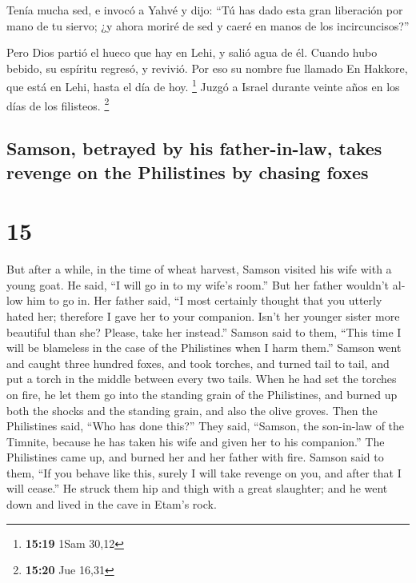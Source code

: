 \begin{paracol}{2}
 Tenía mucha sed, e invocó a Yahvé y dijo: ``Tú has dado
esta gran liberación por mano de tu siervo; ¿y ahora moriré de sed y
caeré en manos de los incircuncisos?''

 Pero Dios partió el hueco que hay en Lehi, y salió agua
de él. Cuando hubo bebido, su espíritu regresó, y revivió. Por eso su
nombre fue llamado En Hakkore, que está en Lehi, hasta el día de hoy.
\footnote{\textbf{15:19} 1Sam 30,12}  Juzgó a Israel
durante veinte años en los días de los filisteos. \footnote{\textbf{15:20}
  Jue 16,31}

\switchcolumn
\begin{otherlanguage}{english}

\hypertarget{samson-betrayed-by-his-father-in-law-takes-revenge-on-the-philistines-by-chasing-foxes}{%
\subsection{Samson, betrayed by his father-in-law, takes revenge on the
Philistines by chasing
foxes}\label{samson-betrayed-by-his-father-in-law-takes-revenge-on-the-philistines-by-chasing-foxes}}

\hypertarget{section-29}{%
\section{15}\label{section-29}}

 But after a while, in the time of wheat harvest, Samson
visited his wife with a young goat. He said, ``I will go in to my wife's
room.'' But her father wouldn't allow him to go in.  Her
father said, ``I most certainly thought that you utterly hated her;
therefore I gave her to your companion. Isn't her younger sister more
beautiful than she? Please, take her instead.''  Samson
said to them, ``This time I will be blameless in the case of the
Philistines when I harm them.''  Samson went and caught
three hundred foxes, and took torches, and turned tail to tail, and put
a torch in the middle between every two tails.  When he
had set the torches on fire, he let them go into the standing grain of
the Philistines, and burned up both the shocks and the standing grain,
and also the olive groves.  Then the Philistines said,
``Who has done this?'' They said, ``Samson, the son-in-law of the
Timnite, because he has taken his wife and given her to his companion.''
The Philistines came up, and burned her and her father with fire.
 Samson said to them, ``If you behave like this, surely I
will take revenge on you, and after that I will cease.'' 
He struck them hip and thigh with a great slaughter; and he went down
and lived in the cave in Etam's rock.


\end{otherlanguage}
\end{paracol}

